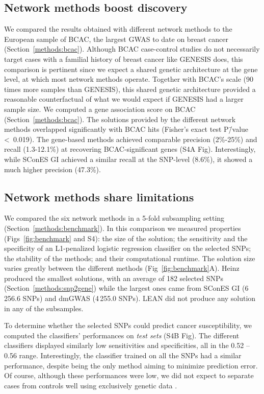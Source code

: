 \documentclass[10pt,letterpaper]{article}
\begin{document}
\subsection{Network methods boost discovery}
\label{results:boost}

We compared the results obtained with different network methods to the European sample of BCAC, the largest GWAS to date on breast cancer (Section~\ref{methods:bcac}). Although BCAC case-control studies do not necessarily target cases with a familial history of breast cancer like GENESIS does, this comparison is pertinent since we expect a shared genetic architecture at the gene level, at which most network methods operate. Together with BCAC's scale (90 times more samples than GENESIS), this shared genetic architecture provided a reasonable counterfactual of what we would expect if GENESIS had a larger sample size. We computed a gene association score on BCAC (Section~\ref{methods:bcac}). The solutions provided by the different  network methods overlapped significantly with BCAC hits (Fisher's exact test P\=/value \textless~0.019). The gene-based methods achieved comparable precision (2\%-25\%) and recall (1.3-12.1\%) at recovering BCAC-significant genes (S4A Fig). Interestingly, while SConES GI achieved a similar recall at the SNP-level (8.6\%), it showed a much higher precision (47.3\%).

\subsection{Network methods share limitations}
\label{results:benchmark}

We compared the six network methods in a 5-fold subsampling setting (Section~\ref{methods:benchmark}). In this comparison we measured properties (Figs~\ref{fig:benchmark} and S4): the size of the solution; the sensitivity and the specificity of an L1-penalized logistic regression classifier on the selected SNPs; the stability of the methods; and their computational runtime. The solution size varies greatly between the different methods (Fig~\ref{fig:benchmark}A). Heinz produced the smallest solutions, with an average of 182 selected SNPs (Section~\ref{methods:snp2gene}) while the largest ones came from SConES GI (6\,256.6 SNPs) and dmGWAS (4\,255.0 SNPs). LEAN did not produce any solution in any of the subsamples. 

To determine whether the selected SNPs could predict cancer susceptibility, we computed the classifiers' performances on \emph{test sets} (S4B Fig). The different classifiers displayed similarly low sensitivities and specificities, all in the 0.52 -- 0.56 range. Interestingly, the classifier trained on all the SNPs had a similar performance, despite being the only method aiming to minimize prediction error. Of course, although these performances were low, we did not expect to separate cases from controls well using exclusively genetic data \cite{deloscamposComplexTraitPredictionEra2018}.
\end{document}
